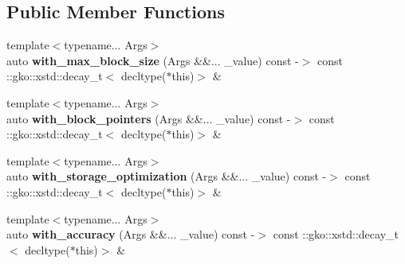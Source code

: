 \subsection*{Public Member Functions}
\begin{DoxyCompactItemize}
\item 
\mbox{\label{structgko_1_1preconditioner_1_1Jacobi_1_1parameters__type_a4514d906e32b8331a0c9c90ff29f4fbd}} 
{\footnotesize template$<$typename... Args$>$ }\\auto {\bfseries with\+\_\+max\+\_\+block\+\_\+size} (Args \&\&... \+\_\+value) const -\/$>$ const \+::gko\+::xstd\+::decay\+\_\+t$<$ decltype($\ast$this)$>$ \&
\item 
\mbox{\label{structgko_1_1preconditioner_1_1Jacobi_1_1parameters__type_a9fcbaa7fdaf17490d0b6a5fccfe70e80}} 
{\footnotesize template$<$typename... Args$>$ }\\auto {\bfseries with\+\_\+block\+\_\+pointers} (Args \&\&... \+\_\+value) const -\/$>$ const \+::gko\+::xstd\+::decay\+\_\+t$<$ decltype($\ast$this)$>$ \&
\item 
\mbox{\label{structgko_1_1preconditioner_1_1Jacobi_1_1parameters__type_a2c213c5e7a4b749e8def7c627057b2e2}} 
{\footnotesize template$<$typename... Args$>$ }\\auto {\bfseries with\+\_\+storage\+\_\+optimization} (Args \&\&... \+\_\+value) const -\/$>$ const \+::gko\+::xstd\+::decay\+\_\+t$<$ decltype($\ast$this)$>$ \&
\item 
\mbox{\label{structgko_1_1preconditioner_1_1Jacobi_1_1parameters__type_ab6c8cbe0cab5d055b509c74eba740aef}} 
{\footnotesize template$<$typename... Args$>$ }\\auto {\bfseries with\+\_\+accuracy} (Args \&\&... \+\_\+value) const -\/$>$ const \+::gko\+::xstd\+::decay\+\_\+t$<$ decltype($\ast$this)$>$ \&
\end{DoxyCompactItemize}
